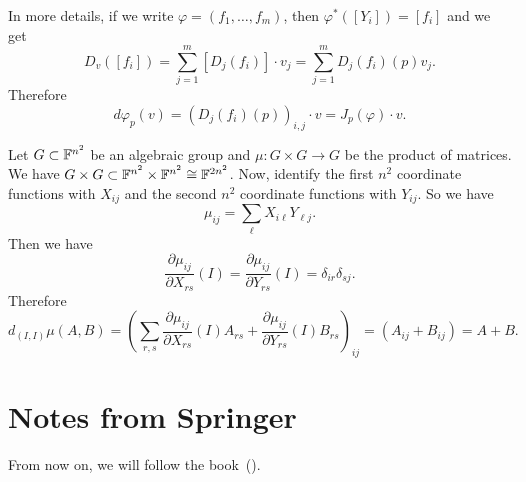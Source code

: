 \begin{itemize}
  In more details, if we write $\varphi=(f_1,\dots, f_m)$, then $\varphi^*([Y_i])=[f_i]$ and we get 
  \begin{equation}
    D_v([f_i]) = \sum_{j=1}^m[D_j(f_i)]\cdot v_j = \sum_{j=1}^m D_j(f_i)(p)v_j.
  \end{equation}
  Therefore 
  \begin{equation}
    d\varphi_p(v) = (D_j(f_i)(p))_{i,j} \cdot v = J_p(\varphi)\cdot v.
  \end{equation}

  \begin{example}
    Let $G\subset \mathbb{F}^{n^2}$ be an algebraic group and $\mu:G\times G\to G$ be the product of matrices. 
    We have $G\times G\subset \mathbb{F}^{n^2}\times\mathbb{F}^{n^2}\cong \mathbb{F}^{2n^2}$. Now, identify the
    first $n^2$ coordinate functions with $X_{ij}$ and the second $n^2$ coordinate functions with $Y_{ij}$. So we have 
    \begin{equation}
        \mu_{ij} = \sum_\ell X_{i\ell}Y_{\ell j}.
    \end{equation} 
    Then we have 
    \begin{equation}
        \frac{\partial \mu_{ij}}{\partial X_{rs}}(I) = \frac{\partial \mu_{ij}}{\partial Y_{rs}}(I) =\delta_{ir}\delta_{sj}.
    \end{equation}
    Therefore 
    \begin{equation}
        d_{(I,I)}\mu(A,B) = (\sum_{r,s} \frac{\partial \mu_{ij}}{\partial X_{rs}}(I)A_{rs}+
          \frac{\partial \mu_{ij}}{\partial Y_{rs}}(I)B_{rs}  )_{ij} = (A_{ij} + B_{ij}) = A+B.
    \end{equation}
  \end{example}
\end{itemize}

\section{Notes from Springer}
From now on, we will follow the book~(\cite{springer1998linear}).
 
